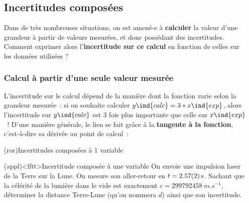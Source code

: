 \documentclass[../../main/main.tex]{subfiles}
\begin{document}
\subsection{Incertitudes composées}
Dans de très nombreuses situations, on est amené-e à \textbf{calculer} la valeur
d'une grandeur à partir de valeurs mesurées, et donc possédant des incertitudes.
Comment exprimer alors l'\textbf{incertitude sur ce calcul} en fonction de
celles sur les données utilisées ?

\subsubsection{Calcul à partir d'une seule valeur mesurée}
L'incertitude sur le calcul dépend de la manière dont la fonction varie selon
la grandeur mesurée~: si on souhaite calculer $y\ind{calc} = 3*x\ind{exp}$, alors l'incertitude sur
$y\ind{calc}$ est 3 fois plus importante que celle sur $x\ind{exp}$~! D'une
manière générale, le lien se fait grâce à la \textbf{tangente à la fonction},
c'est-à-dire sa dérivée au point de calcul~:
\begin{tcb*}(ror){Incertitudes composées à 1 variable}
	\psw{%
		\[
			\boxed{y\ind{calc} = f(x\ind{mes}) \Ra u(y\ind{calc}) =
				\abs{\dv{f}{x}(x\ind{mes})}u(x\ind{mes})}
		\]
	}%
\end{tcb*}

\begin{tcb*}[breakable](appl)<lftt>{Incertitude composée à une variable}
	On envoie une impulsion laser de la Terre sur la Lune. On mesure son
	aller-retour en $t = \SI{2.57 \pm 0.02}{s}$. Sachant que la célérité de la
	lumière dans le vide est exactement $c = \SI{299792458}{m.s^{-1}}$, déterminer
	la distance Terre-Lune (qu'on nommera $d$) ainsi que son incertitude.
	\tcblower
	\vspace*{-10pt}
	\begin{isd}
		\vspace*{-10pt}
		\tcblower
		\vspace*{-10pt}
	\end{isd}
\end{tcb*}
\end{document}
